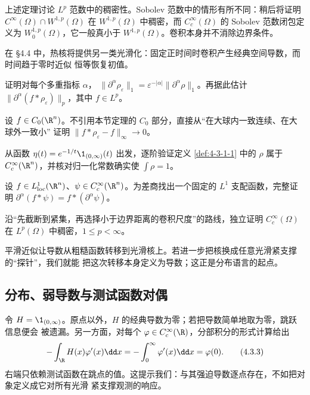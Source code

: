 上述定理讨论 $L^p$ 范数中的稠密性。Sobolev 范数中的情形有所不同：稍后将证明
$C^\infty(\Omega)\cap W^{1,p}(\Omega)$ 在 $W^{1,p}(\Omega)$ 中稠密，而
$C_c^\infty(\Omega)$ 的 Sobolev 范数闭包定义为 $W_0^{1,p}(\Omega)$，它一般真小于
$W^{1,p}(\Omega)$。卷积本身并不消除边界条件。

在 \S4.4 中，热核将提供另一类光滑化：固定正时间时卷积产生经典空间导数，而时间趋于零时近似
恒等恢复初值。

\begin{exercise}
证明对每个多重指标 $\alpha$，
$\|\partial^\alpha\rho_\varepsilon\|_1
=\varepsilon^{-|\alpha|}\|\partial^\alpha\rho\|_1$。再据此估计
$\|\partial^\alpha(f*\rho_\varepsilon)\|_p$，其中 $f\in L^p$。
\end{exercise}

\begin{exercise}
设 $f\in C_0(\R^n)$。不引用本节定理的 $C_0$ 部分，直接从“在大球内一致连续、在大球外一致小”
证明 $\|f*\rho_\varepsilon-f\|_\infty\to0$。
\end{exercise}

\begin{exercise}
从函数 $\eta(t)=e^{-1/t}\1_{(0,\infty)}(t)$ 出发，逐阶验证定义
\ref{def:4-3-1-1} 中的 $\rho$ 属于 $C_c^\infty(\R^n)$，并核对归一化常数确实使
$\int\rho=1$。
\end{exercise}

\begin{exercise}
设 $f\in L^1_{\mathrm{loc}}(\R^n)$、$\psi\in C_c^\infty(\R^n)$。为差商找出一个固定的
$L^1$ 支配函数，完整证明
$\partial^\alpha(f*\psi)=f*(\partial^\alpha\psi)$。
\end{exercise}

\begin{exercise}
沿“先截断到紧集，再选择小于边界距离的卷积尺度”的路线，独立证明
$C_c^\infty(\Omega)$ 在 $L^p(\Omega)$ 中稠密，$1\leq p<\infty$。
\end{exercise}

平滑近似让导数从粗糙函数转移到光滑核上。若进一步把核换成任意光滑紧支撑的“探针”，我们就能
把这次转移本身定义为导数；这正是分布语言的起点。

\subsection{分布、弱导数与测试函数对偶}\label{subsec:4-3-2}

令 $H=\1_{(0,\infty)}$。原点以外，$H$ 的经典导数为零；若把导数简单地取为零，跳跃信息便会
被遗漏。另一方面，对每个 $\varphi\in C_c^\infty(\R)$，分部积分的形式计算给出
\[
 -\int_\R H(x)\varphi'(x)\dd x
 =-\int_0^\infty\varphi'(x)\dd x=\varphi(0).
 \tag{4.3.3}\label{eq:4-3-heaviside-motivation}
\]
右端只依赖测试函数在跳点的值。这提示我们：与其强迫导数逐点存在，不如把对象定义成它对所有光滑
紧支撑观测的响应。

